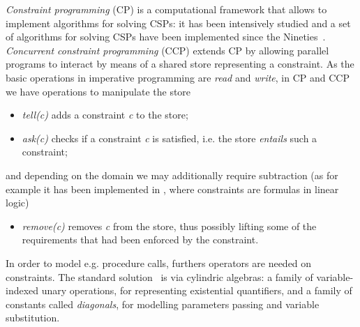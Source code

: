 \documentclass{llncs}
\begin{document}
\emph{Constraint programming} (CP) is a computational framework that allows to implement algorithms for solving CSPs:  
it has been intensively studied and a set of algorithms for solving CSPs have been implemented since the Nineties~\cite{aijour}. 
%
\emph{Concurrent constraint programming} (CCP) extends CP by allowing parallel programs to interact by means of a shared store representing a constraint. 
%
As the basic operations in imperative programming are \emph{read} and \emph{write}, in CP and CCP we have operations to manipulate the store
\begin{itemize}
	\item \emph{tell(c)} adds a constraint \emph{c} to the store;
	\item \emph{ask(c)} checks if a constraint \emph{c} is satisfied, i.e. the store \emph{entails} such a constraint;
\end{itemize}
\noindent
and depending on the domain we may additionally require subtraction (as for example it has been implemented in \cite{lcc}, 
where constraints are formulas in linear logic)
\begin{itemize}
	\item \emph{remove(c)} removes \emph{c} from the store, thus possibly lifting some of the requirements that had been enforced by the constraint. 
\end{itemize}
%
%
In order to model e.g. procedure calls, furthers operators are needed on constraints. 
%
The standard solution~\cite{popl91} is via cylindric algebras: a family of variable-indexed unary operations, %
for representing existential quantifiers, and a family of constants called \emph{diagonals}, 
for modelling parameters passing and variable substitution.
\end{document}
